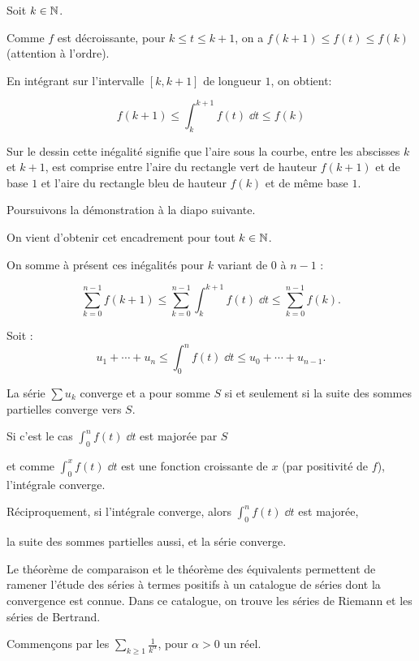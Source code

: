 Soit $k\in\mathbb{N}$. 

\change
Comme $f$ est décroissante, pour $k\le t \le k+1$, on a $f(k+1)\le f(t)\le f(k)$ (attention à l'ordre). 

\change
En intégrant sur l'intervalle $[k,k+1]$ de longueur $1$, on obtient:

\change
$$f(k+1)\le \int_k^{k+1} f(t) \; \dd t \le f(k)$$  

\change
Sur le dessin cette inégalité signifie que l'aire sous la courbe, 
entre les abscisses $k$ et $k+1$, est comprise entre l'aire du 
rectangle vert de hauteur $f(k+1)$ et de base $1$ et 
l'aire du rectangle bleu de hauteur $f(k)$ et de même base $1$.

Poursuivons la démonstration à la diapo suivante.

\diapo

On vient d'obtenir cet encadrement pour tout $k\in\mathbb{N}$.

\change
On somme à présent ces inégalités pour $k$ variant de $0$ à $n-1$ :

\change
$$\sum_{k=0}^{n-1} f(k+1) \le \sum_{k=0}^{n-1} \int_{k}^{k+1} f(t) \; \dd t
\le \sum_{k=0}^{n-1} f(k).$$

\change
Soit :
$$u_1+\cdots+u_{n} \le \int_0^{n} f(t)\; \dd t \le u_0+\cdots+u_{n-1}.$$

\change
La série $\sum u_k$ converge et a pour somme $S$ si et seulement si la suite des sommes
partielles converge vers $S$. 

\change 
Si c'est le cas $\int_0^{n} f(t)\; \dd t$ est majorée par $S$

\change
et comme $\int_0^x f(t)\; \dd t$ est une fonction croissante de $x$ (par positivité de $f$), l'intégrale converge. 

\change
Réciproquement, si l'intégrale converge, alors $\int_0^{n} f(t)\;\dd t$ est majorée, 

\change
la suite des sommes partielles aussi, et la série converge.

\diapo

Le théorème de comparaison et le théorème des équivalents permettent de ramener l'étude des séries à termes positifs à un catalogue de séries dont la convergence est connue. Dans ce catalogue, on trouve les séries de Riemann et les séries de Bertrand.

Commençons par les  $\sum_{k\ge 1} \frac{1}{k^\alpha}$, pour $\alpha>0$
un réel.

